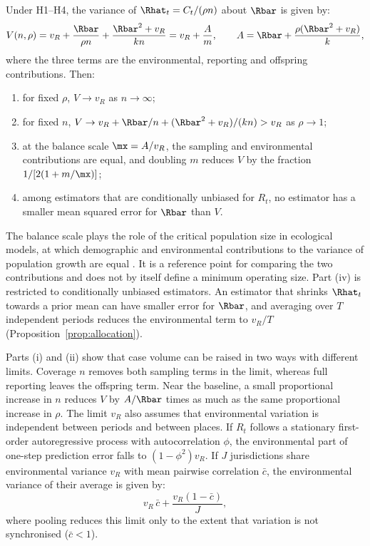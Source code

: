 \begin{proposition}
\label{prop:average}
Under H1--H4, the variance of $\Rhat_t=C_t/(\rho n)$ about $\Rbar$ is given by:
\begin{equation}
  V(n,\rho)=v_R+\frac{\Rbar}{\rho n}+\frac{\Rbar^2+v_R}{kn}=v_R+\frac{A}{m},
  \qquad A=\Rbar+\frac{\rho(\Rbar^2+v_R)}{k},
  \label{eq:var-average}
\end{equation}
where the three terms are the environmental, reporting and offspring contributions. Then:
\begin{enumerate}[label=(\roman*),leftmargin=2em]
  \item for fixed $\rho$, $V\to v_R$ as $n\to\infty$;
  \item for fixed $n$, $V\to v_R+\Rbar/n+(\Rbar^2+v_R)/(kn)>v_R$ as $\rho\to1$;
  \item at the balance scale $\mx=A/v_R$, the sampling and environmental contributions are equal, and doubling $m$ reduces $V$ by the fraction $1/[2(1+m/\mx)]$;
  \item among estimators that are conditionally unbiased for $R_t$, no estimator has a smaller mean squared error for $\Rbar$ than $V$.
\end{enumerate}
\end{proposition}

The balance scale plays the role of the critical population size in ecological models, at which demographic and environmental contributions to the variance of population growth are equal \citep{lande2003stochastic}. It is a reference point for comparing the two contributions and does not by itself define a minimum operating size. Part (iv) is restricted to conditionally unbiased estimators. An estimator that shrinks $\Rhat_t$ towards a prior mean can have smaller error for $\Rbar$, and averaging over $T$ independent periods reduces the environmental term to $v_R/T$ (Proposition~\ref{prop:allocation}).

Parts (i) and (ii) show that case volume can be raised in two ways with different limits. Coverage $n$ removes both sampling terms in the limit, whereas full reporting leaves the offspring term. Near the baseline, a small proportional increase in $n$ reduces $V$ by $A/\Rbar$ times as much as the same proportional increase in $\rho$. The limit $v_R$ also assumes that environmental variation is independent between periods and between places. If $R_t$ follows a stationary first-order autoregressive process with autocorrelation $\phi$, the environmental part of one-step prediction error falls to $(1-\phi^2)v_R$. If $J$ jurisdictions share environmental variance $v_R$ with mean pairwise correlation $\bar{c}$, the environmental variance of their average is given by:
\begin{equation}
  v_R\,\bar{c}+\frac{v_R(1-\bar{c})}{J},
  \label{eq:pooling}
\end{equation}
where pooling reduces this limit only to the extent that variation is not synchronised ($\bar{c}<1$).

